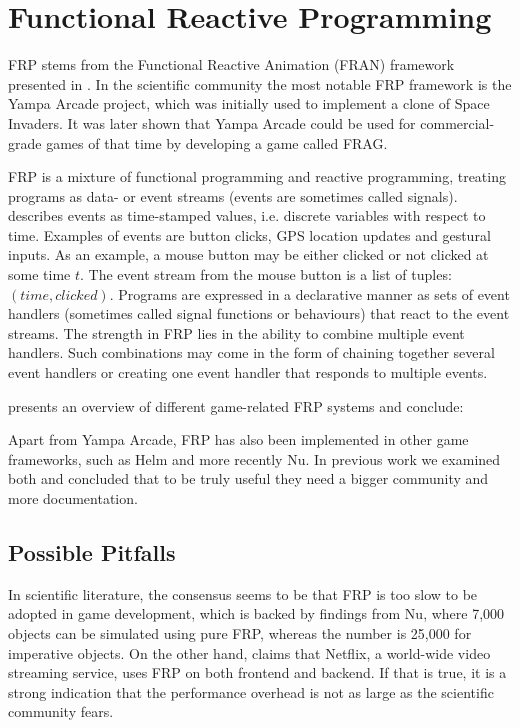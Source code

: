 \section{Functional Reactive Programming}\label{sec:frp}
\gls{FRP} stems from the Functional Reactive Animation (FRAN) framework presented in \cite{ElliottHudak97:Fran}. In the scientific community the most notable \gls{FRP} framework is the Yampa Arcade project\cite{courtney2003yampa}, which was initially used to implement a clone of Space Invaders. It was later shown that Yampa Arcade could be used for commercial-grade games of that time by developing a game called FRAG\cite{cheong2005functional}.

\gls{FRP} is a mixture of functional programming and reactive programming, treating programs as data- or event streams (events are sometimes called signals). \cite{lettier:frp} describes events as time-stamped values, i.e. discrete variables with respect to time. Examples of events are button clicks, GPS location updates and gestural inputs\cite{singh:frp}. As an example, a mouse button may be either clicked or not clicked at some time $t$. The event stream from the mouse button is a list of tuples: $(time,clicked)$. Programs are expressed in a declarative manner as sets of event handlers (sometimes called signal functions or behaviours) that react to the event streams. The strength in \gls{FRP} lies in the ability to combine multiple event handlers. Such combinations may come in the form of chaining together several event handlers or creating one event handler that responds to multiple events\cite{lettier:frp}.

\cite{maraffi:frp} presents an overview of different game-related \gls{FRP} systems and conclude:

Apart from Yampa Arcade, \gls{FRP} has also been implemented in other game frameworks, such as Helm \cite{helm:wiki} and more recently Nu\cite{nu:github}. In previous work we examined both and concluded that to be truly useful they need a bigger community and more documentation\cite{p92018gameplay}.

\subsection{Possible Pitfalls}
In scientific literature, the consensus seems to be that \gls{FRP} is too slow to be adopted in game development\cite{maraffi:frp,cheong2005functional}, which is backed by findings from Nu, where 7,000 objects can be simulated using pure \gls{FRP}, whereas the number is 25,000 for imperative objects\cite{edds2016whyFunctional}. On the other hand, \cite{rey:frp} claims that Netflix, a world-wide video streaming service, uses \gls{FRP} on both frontend and backend. If that is true, it is a strong indication that the performance overhead is not as large as the scientific community fears.

